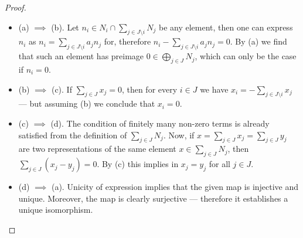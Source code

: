 \begin{proof}
    \begin{itemize}\setlength\itemsep{0em}
        \item (a) \(\implies\) (b). Let
              \(n_i \in N_i \cap \sum_{j \in J \setminus i} N_j\) be any element, then one
              can express \(n_i\) as \(n_i = \sum_{j \in J \setminus i} a_j  n_j\) for,
              therefore \(n_i - \sum_{j \in J \setminus i} a_j n_j = 0\). By (a) we find
              that such an element has preimage \(0 \in \bigoplus_{j \in J} N_j\), which can
              only be the case if \(n_i = 0\).

        \item (b) \(\implies\) (c). If \(\sum_{j \in J} x_j = 0\), then for every \(i
              \in J\) we have \(x_i = - \sum_{j \in J \setminus i} x_j\) --- but assuming
              (b) we conclude that \(x_i = 0\).

        \item (c) \(\implies\) (d). The condition of finitely many non-zero terms is
              already satisfied from the definition of \(\sum_{j \in J} N_j\). Now, if
              \(x = \sum_{j \in J} x_j = \sum_{j \in J} y_j\) are two representations of the
              same element \(x \in \sum_{j \in J} N_j\), then
              \(\sum_{j \in J}(x_j - y_j) = 0\). By (c) this implies in \(x_j = y_j\) for
              all \(j \in J\).

        \item (d) \(\implies\) (a). Unicity of expression implies that the given map is
              injective and unique. Moreover, the map is clearly surjective --- therefore it
              establishes a unique isomorphism.
    \end{itemize}
\end{proof}


